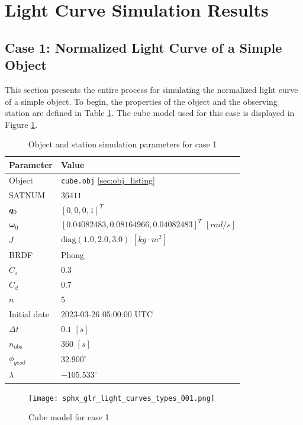 \section{Light Curve Simulation Results}

\subsection{Case 1: Normalized Light Curve of a Simple Object}

This section presents the entire process for simulating the normalized light curve of a simple object. To begin, the properties of the object and the observing station are defined in Table \ref{tb:case1_obj_props}. The cube model used for this case is displayed in Figure \ref{fig:case1_obj}.

\begin{table}[]
  \centering
  \begin{tabular}{|l|l|}
  \hline
  \textbf{Parameter} & \textbf{Value} \\ \hline
  Object & \texttt{cube.obj} \ref{sec:obj_listing} \\ \hline
  SATNUM & $36411$ \\ \hline
  $\bm{q}_0$ & $\left[ 0, 0, 0, 1 \right]^T$ \\ \hline
  $\boldsymbol{\omega}_0$ & $\left[ 0.04082483, 0.08164966, 0.04082483 \right]^T$ $[rad/s]$ \\ \hline
  $J$ & $\mathrm{diag}\left( 1.0, 2.0, 3.0 \right)$ $\left[ kg \cdot m^2 \right]$ \\ \hline
  BRDF & Phong \\ \hline
  $C_s$ & $0.3$ \\ \hline
  $C_d$ & $0.7$ \\ \hline
  $n$ & $5$ \\ \hline
  Initial date & 2023-03-26 05:00:00 UTC \\ \hline
  $\Delta t$ & $0.1$ $[s]$ \\ \hline
  $n_\mathrm{obs}$ & $360$ $[s]$ \\ \hline
  $\phi_{geod}$ & $32.900^\circ$ \\ \hline
  $\lambda$ & $-105.533^\circ$ \\ \hline
  \end{tabular}
  \caption{Object and station simulation parameters for case 1}
  \label{tb:case1_obj_props}
\end{table}

\graphicspath{{/Users/liamrobinson/Documents/PyLightCurves/docs/build/html/_images}}
\begin{figure}[!htb]
  \centering
  \texttt{[image: sphx\_glr\_light\_curves\_types\_001.png]}
  \caption{Cube model for case 1}
  \label{fig:case1_obj}
\end{figure}

